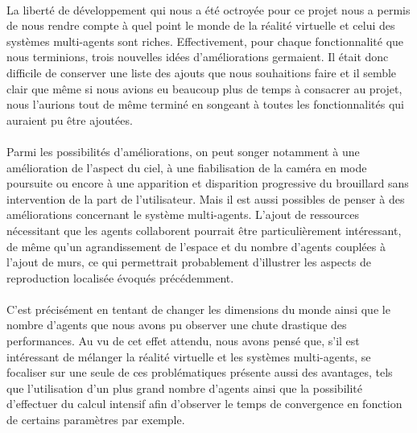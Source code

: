 \paragraph{}
La liberté de développement qui nous a été octroyée pour ce projet nous a
permis de nous rendre compte à quel point le monde de la réalité virtuelle et
celui des systèmes multi-agents sont riches. Effectivement, pour chaque
fonctionnalité que nous terminions, trois nouvelles idées d'améliorations
germaient. Il était donc difficile de conserver une liste des ajouts que nous
souhaitions faire et il semble clair que même si nous avions eu beaucoup plus
de temps à consacrer au projet, nous l'aurions tout de même terminé en
songeant à toutes les fonctionnalités qui auraient pu être ajoutées.

\paragraph{}
Parmi les possibilités d'améliorations, on peut songer notamment à une
amélioration de l'aspect du ciel, à une fiabilisation de la caméra en mode
poursuite ou encore à une apparition et disparition progressive du brouillard
sans intervention de la part de l'utilisateur. Mais il est aussi possibles de 
penser à des améliorations concernant le système multi-agents. L'ajout de
ressources nécessitant que les agents collaborent pourrait être
particulièrement intéressant, de même qu'un agrandissement de l'espace et du
nombre d'agents couplées à l'ajout de murs, ce qui permettrait probablement
d'illustrer les aspects de reproduction localisée évoqués précédemment.

\paragraph{}
C'est précisément en tentant de changer les dimensions du monde ainsi que le
nombre d'agents que nous avons pu observer une chute drastique des
performances. Au vu de cet effet attendu, nous avons pensé que, s'il est
intéressant de mélanger la réalité virtuelle et les systèmes multi-agents, se
focaliser sur une seule de ces problématiques présente aussi des avantages,
tels que l'utilisation d'un plus grand nombre d'agents ainsi que la
possibilité d'effectuer du calcul intensif afin d'observer le temps de
convergence en fonction de certains paramètres par exemple.
